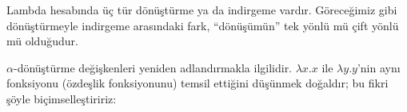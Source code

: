 


Lambda hesabında üç tür dönüştürme ya da indirgeme vardır. Göreceğimiz gibi
dönüştürmeyle indirgeme arasındaki fark, ``dönüşümün'' tek yönlü mü çift
yönlü mü olduğudur.

$\alpha$-dönüştürme değişkenleri yeniden adlandırmakla ilgilidir.
$\lambda x.x$ ile $\lambda y.y$'nin aynı fonksiyonu (özdeşlik fonksiyonunu)
temsil ettiğini düşünmek doğaldır; bu fikri şöyle biçimselleştiririz:

